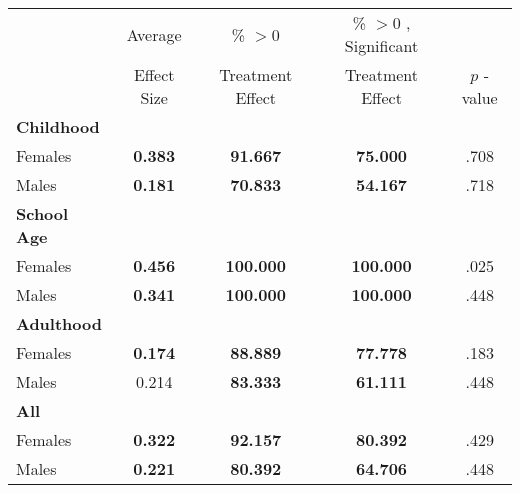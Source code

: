 \begin{tabular}{l c c c c}
\toprule
 & Average & \% $ >0 $ & \% $ >0 $ , Significant & \citet{Rosenbaum_2005_Distribution_JRSS} \\
 & Effect Size & Treatment Effect & Treatment Effect & $ p $ -value \\
\midrule
\textbf{Childhood} & & & & \\
\quad Females &  \textbf{    0.383} & \textbf{   91.667} & \textbf{   75.000} & .708 \\
\quad Males &  \textbf{    0.181} & \textbf{   70.833} & \textbf{   54.167} & .718 \\
\midrule
\textbf{School Age} & & & & \\
\quad Females &  \textbf{    0.456} & \textbf{  100.000} & \textbf{  100.000} & .025 \\
\quad Males &  \textbf{    0.341} & \textbf{  100.000} & \textbf{  100.000} & .448 \\
\midrule
\textbf{Adulthood} & & & & \\
\quad Females &  \textbf{    0.174} & \textbf{   88.889} & \textbf{   77.778} & .183 \\
\quad Males &      0.214 & \textbf{   83.333} & \textbf{   61.111} & .448 \\
\midrule
\textbf{All} & & & & \\
\quad Females &  \textbf{    0.322} & \textbf{   92.157} & \textbf{   80.392} & .429 \\
\quad Males &  \textbf{    0.221} & \textbf{   80.392} & \textbf{   64.706} & .448 \\
\bottomrule
\end{tabular}
